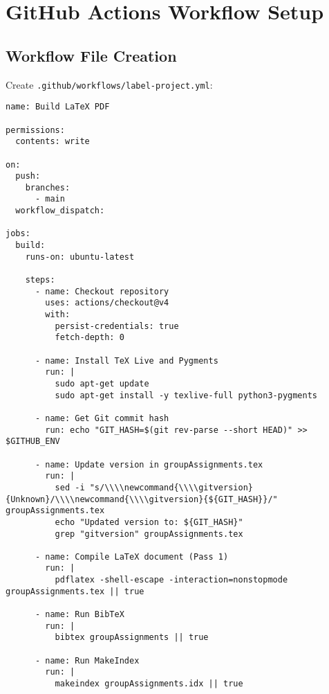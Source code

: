 \section{GitHub Actions Workflow Setup}

\subsection{Workflow File Creation}

Create \texttt{.github/workflows/label-project.yml}:

\begin{verbatim}
name: Build LaTeX PDF

permissions:
  contents: write

on:
  push:
    branches:
      - main
  workflow_dispatch:

jobs:
  build:
    runs-on: ubuntu-latest

    steps:
      - name: Checkout repository
        uses: actions/checkout@v4
        with:
          persist-credentials: true
          fetch-depth: 0

      - name: Install TeX Live and Pygments
        run: |
          sudo apt-get update
          sudo apt-get install -y texlive-full python3-pygments

      - name: Get Git commit hash
        run: echo "GIT_HASH=$(git rev-parse --short HEAD)" >> $GITHUB_ENV

      - name: Update version in groupAssignments.tex
        run: |
          sed -i "s/\\\\newcommand{\\\\gitversion}{Unknown}/\\\\newcommand{\\\\gitversion}{${GIT_HASH}}/" groupAssignments.tex
          echo "Updated version to: ${GIT_HASH}"
          grep "gitversion" groupAssignments.tex

      - name: Compile LaTeX document (Pass 1)
        run: |
          pdflatex -shell-escape -interaction=nonstopmode groupAssignments.tex || true

      - name: Run BibTeX
        run: |
          bibtex groupAssignments || true

      - name: Run MakeIndex
        run: |
          makeindex groupAssignments.idx || true


\end{verbatim}
